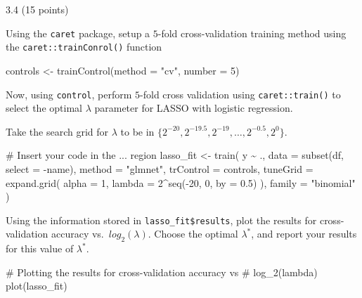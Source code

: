 \documentclass[
  letterpaper,
  DIV=11,
  numbers=noendperiod]{scrartcl}
\newenvironment{Shaded}{\begin{snugshade}}{\end{snugshade}}
\newcommand{\AttributeTok}[1]{\textcolor[rgb]{0.40,0.45,0.13}{#1}}
\newcommand{\CommentTok}[1]{\textcolor[rgb]{0.37,0.37,0.37}{#1}}
\newcommand{\DecValTok}[1]{\textcolor[rgb]{0.68,0.00,0.00}{#1}}
\newcommand{\FloatTok}[1]{\textcolor[rgb]{0.68,0.00,0.00}{#1}}
\newcommand{\FunctionTok}[1]{\textcolor[rgb]{0.28,0.35,0.67}{#1}}
\newcommand{\NormalTok}[1]{\textcolor[rgb]{0.00,0.23,0.31}{#1}}
\newcommand{\OtherTok}[1]{\textcolor[rgb]{0.00,0.23,0.31}{#1}}
\newcommand{\SpecialCharTok}[1]{\textcolor[rgb]{0.37,0.37,0.37}{#1}}
\newcommand{\StringTok}[1]{\textcolor[rgb]{0.13,0.47,0.30}{#1}}
\begin{document}
3.4 (15 points)

Using the \texttt{caret} package, setup a \(5\)-fold cross-validation
training method using the \texttt{caret::trainConrol()} function

\begin{Shaded}
\begin{Highlighting}[]
\NormalTok{controls }\OtherTok{\textless{}{-}} \FunctionTok{trainControl}\NormalTok{(}\AttributeTok{method =} \StringTok{"cv"}\NormalTok{, }\AttributeTok{number =} \DecValTok{5}\NormalTok{)}
\end{Highlighting}
\end{Shaded}

Now, using \texttt{control}, perform \(5\)-fold cross validation using
\texttt{caret::train()} to select the optimal \(\lambda\) parameter for
LASSO with logistic regression.

Take the search grid for \(\lambda\) to be in
\(\{ 2^{-20}, 2^{-19.5}, 2^{-19}, \dots, 2^{-0.5}, 2^{0} \}\).

\begin{Shaded}
\begin{Highlighting}[]
\CommentTok{\# Insert your code in the ... region}
\NormalTok{lasso\_fit }\OtherTok{\textless{}{-}} \FunctionTok{train}\NormalTok{(}
\NormalTok{  y }\SpecialCharTok{\textasciitilde{}}\NormalTok{ .,}
  \AttributeTok{data =} \FunctionTok{subset}\NormalTok{(df, }\AttributeTok{select =} \SpecialCharTok{{-}}\NormalTok{name),}
  \AttributeTok{method =} \StringTok{"glmnet"}\NormalTok{,}
  \AttributeTok{trControl =}\NormalTok{ controls, }
  \AttributeTok{tuneGrid =} \FunctionTok{expand.grid}\NormalTok{(}
    \AttributeTok{alpha =} \DecValTok{1}\NormalTok{,}
    \AttributeTok{lambda =} \DecValTok{2}\SpecialCharTok{\^{}}\FunctionTok{seq}\NormalTok{(}\SpecialCharTok{{-}}\DecValTok{20}\NormalTok{, }\DecValTok{0}\NormalTok{, }\AttributeTok{by =} \FloatTok{0.5}\NormalTok{)}
\NormalTok{    ),}
  \AttributeTok{family =} \StringTok{"binomial"}
\NormalTok{)}
\end{Highlighting}
\end{Shaded}

Using the information stored in \texttt{lasso\_fit\$results}, plot the
results for cross-validation accuracy vs.~\(log_2(\lambda)\). Choose the
optimal \(\lambda^*\), and report your results for this value of
\(\lambda^*\).

\begin{Shaded}
\begin{Highlighting}[]
\CommentTok{\# Plotting the results for cross{-}validation accuracy vs }
\CommentTok{\# log\_2(lambda)}
\FunctionTok{plot}\NormalTok{(lasso\_fit)}
\end{Highlighting}
\end{Shaded}
\end{document}
